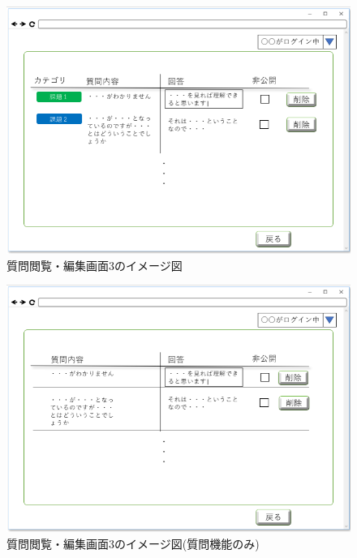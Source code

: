 \begin{figure}[htbp]
  \begin{center}
    \includegraphics[width=1\linewidth,clip]{./img/19.png}
    \caption{質問閲覧・編集画面3のイメージ図}\label{fig:19}
  \end{center}
\end{figure}

\begin{figure}[htbp]
  \begin{center}
    \includegraphics[width=1\linewidth,clip]{./img/000.png}
    \caption{質問閲覧・編集画面3のイメージ図(質問機能のみ)}\label{fig:000}
  \end{center}
\end{figure}

\newpage

